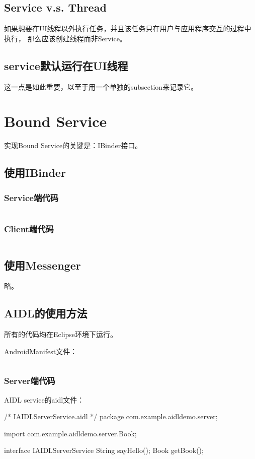 ﻿\documentclass[a4paper,11pt]{article}
\begin{document}
  \subsection[Service v.s. Thread]{Service v.s. Thread}
  如果想要在UI线程以外执行任务，并且该任务只在用户与应用程序交互的过程中执行，
  那么应该创建线程而非Service。

  \subsection[service默认运行在UI线程]{service默认运行在UI线程}
  这一点是如此重要，以至于用一个单独的subsection来记录它。

  \section[Bound Service]{Bound Service}\label{sec:boundservice}
  实现Bound Service的关键是：IBinder接口。
  \subsection[使用IBinder]{使用IBinder}
  \subsubsection[Service端代码]{Service端代码}
  \inputminted[linenos,tabsize=4,bgcolor=srcbg]{java}{LocalService.java}

  \subsubsection[Client端代码]{Client端代码}
  \inputminted[linenos,tabsize=4,bgcolor=srcbg]{java}{BindingActivity.java}

  \subsection[使用Messenger]{使用Messenger}
  略。

  \subsection[AIDL的使用方法]{AIDL的使用方法}
  所有的代码均在Eclipse环境下运行。\par\bigskip
  AndroidManifest文件：\par
  \inputminted[linenos,tabsize=4,bgcolor=srcbg]{xml}{AIDLManifest.xml}

  \subsubsection[Server端代码]{Server端代码}
  AIDL service的aidl文件：\par
  \begin{javacode}
/* IAIDLServerService.aidl */
package com.example.aidldemo.server;

import com.example.aidldemo.server.Book;

interface IAIDLServerService {
    String sayHello();
    Book getBook();
}
  \end{javacode}
\end{document}
